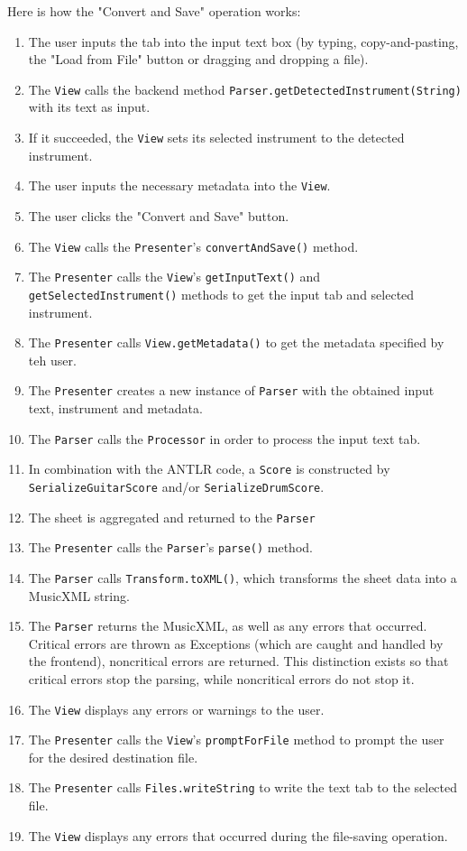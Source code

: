 \documentclass[11pt]{article}
\begin{document}
Here is how the "Convert and Save" operation works:
\begin{enumerate}
\item The user inputs the tab into the input text box (by typing, copy-and-pasting, the "Load from File" button or dragging and dropping a file).
\item The \texttt{View} calls the backend method \texttt{Parser.getDetectedInstrument(String)} with its text as input.
\item If it succeeded, the \texttt{View} sets its selected instrument to the detected instrument.
\item The user inputs the necessary metadata into the \texttt{View}.
\item The user clicks the "Convert and Save" button.
\item The \texttt{View} calls the \texttt{Presenter}'s \texttt{convertAndSave()} method.
\item The \texttt{Presenter} calls the \texttt{View}'s \texttt{getInputText()} and \texttt{getSelectedInstrument()} methods to get the input tab and selected instrument.
\item The \texttt{Presenter} calls \texttt{View.getMetadata()} to get the metadata specified by teh user.
\item The \texttt{Presenter} creates a new instance of \texttt{Parser} with the obtained input text, instrument and metadata.
\item The \texttt{Parser} calls the \texttt{Processor} in order to process the input text tab.
\item In combination with the ANTLR code, a \texttt{Score} is constructed by \texttt{SerializeGuitarScore} and/or \texttt{SerializeDrumScore}.
\item The sheet is aggregated and returned to the \texttt{Parser}
\item The \texttt{Presenter} calls the \texttt{Parser}'s \texttt{parse()} method.
\item The \texttt{Parser} calls \texttt{Transform.toXML()}, which transforms the sheet data into a MusicXML string.
\item The \texttt{Parser} returns the MusicXML, as well as any errors that occurred.  Critical errors are thrown as Exceptions (which are caught and handled by the frontend), noncritical errors are returned.  This distinction exists so that critical errors stop the parsing, while noncritical errors do not stop it.
\item The \texttt{View} displays any errors or warnings to the user.
\item The \texttt{Presenter} calls the \texttt{View}'s \texttt{promptForFile} method to prompt the user for the desired destination file.
\item The \texttt{Presenter} calls \texttt{Files.writeString} to write the text tab to the selected file.
\item The \texttt{View} displays any errors that occurred during the file-saving operation.
\end{enumerate}
\newpage

\end{document}
